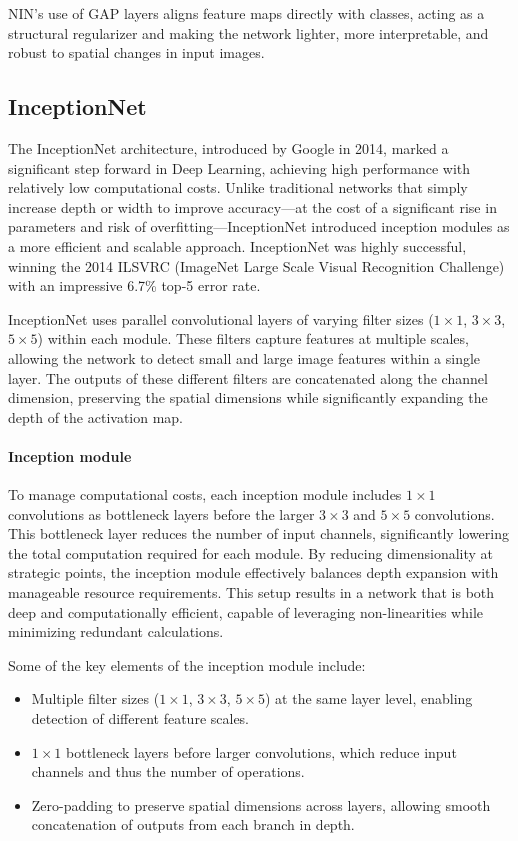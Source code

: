 NIN's use of GAP layers aligns feature maps directly with classes, acting as a structural regularizer and making the network lighter, more interpretable, and robust to spatial changes in input images.

\subsection{InceptionNet}
The InceptionNet architecture, introduced by Google in 2014, marked a significant step forward in Deep Learning, achieving high performance with relatively low computational costs. 
Unlike traditional networks that simply increase depth or width to improve accuracy—at the cost of a significant rise in parameters and risk of overfitting—InceptionNet introduced inception modules as a more efficient and scalable approach. 
InceptionNet was highly successful, winning the 2014 ILSVRC (ImageNet Large Scale Visual Recognition Challenge) with an impressive 6.7\% top-5 error rate.

InceptionNet uses parallel convolutional layers of varying filter sizes ($1\times 1$, $3\times 3$, $5\times 5$) within each module. 
These filters capture features at multiple scales, allowing the network to detect small and large image features within a single layer. 
The outputs of these different filters are concatenated along the channel dimension, preserving the spatial dimensions while significantly expanding the depth of the activation map.

\paragraph*{Inception module} 
To manage computational costs, each inception module includes $1\times 1$ convolutions as bottleneck layers before the larger $3\times 3$ and $5\times 5$ convolutions.
This bottleneck layer reduces the number of input channels, significantly lowering the total computation required for each module. 
By reducing dimensionality at strategic points, the inception module effectively balances depth expansion with manageable resource requirements. 
This setup results in a network that is both deep and computationally efficient, capable of leveraging non-linearities while minimizing redundant calculations.

Some of the key elements of the inception module include:
\begin{itemize}
    \item Multiple filter sizes ($1\times 1$, $3\times 3$, $5\times 5$) at the same layer level, enabling detection of different feature scales.
    \item $1\times 1$ bottleneck layers before larger convolutions, which reduce input channels and thus the number of operations.
    \item Zero-padding to preserve spatial dimensions across layers, allowing smooth concatenation of outputs from each branch in depth.
\end{itemize}

